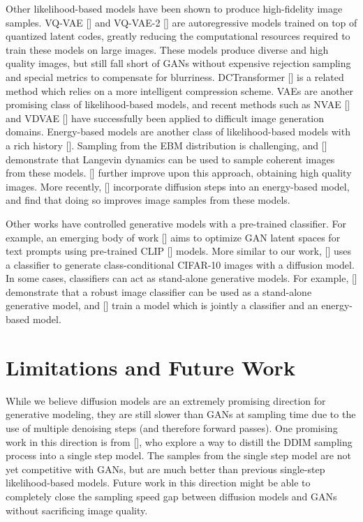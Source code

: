 \documentclass{article}
\newcommand{\shortcite}[1]{[\citenum{#1}]}
\newcommand{\namecite}[1]{\citeauthor{#1} [\citenum{#1}]}
\begin{document}
Other likelihood-based models have been shown to produce high-fidelity image samples. VQ-VAE \shortcite{vqvae} and VQ-VAE-2 \shortcite{vqvae2} are autoregressive models trained on top of quantized latent codes, greatly reducing the computational resources required to train these models on large images. These models produce diverse and high quality images, but still fall short of GANs without expensive rejection sampling and special metrics to compensate for blurriness. DCTransformer \shortcite{dctransformer} is a related method which relies on a more intelligent compression scheme. VAEs are another promising class of likelihood-based models, and recent methods such as NVAE \shortcite{nvae} and VDVAE \shortcite{vdvae} have successfully been applied to difficult image generation domains. Energy-based models are another class of likelihood-based models with a rich history \shortcite{temperature,helmholtz,contrastive}. Sampling from the EBM distribution is challenging, and \namecite{genconv} demonstrate that Langevin dynamics can be used to sample coherent images from these models. \namecite{yilunenergy} further improve upon this approach, obtaining high quality images. More recently, \namecite{diffusionebm} incorporate diffusion steps into an energy-based model, and find that doing so improves image samples from these models.

Other works have controlled generative models with a pre-trained classifier. For example, an emerging body of work \shortcite{clipglass,styleclip,bigsleep} aims to optimize GAN latent spaces for text prompts using pre-trained CLIP \shortcite{clip} models. More similar to our work, \namecite{sde} uses a classifier to generate class-conditional CIFAR-10 images with a diffusion model. In some cases, classifiers can act as stand-alone generative models. For example, \namecite{robustgeneration} demonstrate that a robust image classifier can be used as a stand-alone generative model, and \namecite{jem} train a model which is jointly a classifier and an energy-based model.

\section{Limitations and Future Work}

While we believe diffusion models are an extremely promising direction for generative modeling, they are still slower than GANs at sampling time due to the use of multiple denoising steps (and therefore forward passes). One promising work in this direction is from \namecite{ddimdistill}, who explore a way to distill the DDIM sampling process into a single step model. The samples from the single step model are not yet competitive with GANs, but are much better than previous single-step likelihood-based models. Future work in this direction might be able to completely close the sampling speed gap between diffusion models and GANs without sacrificing image quality.
\end{document}
